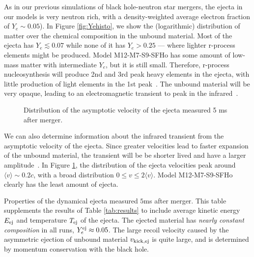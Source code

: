As in our previous simulations of black hole-neutron star mergers, the ejecta in our models is very neutron rich, with a density-weighted average electron fraction of $Y_e \sim 0.05$).  
In Figure \ref{fig:Yehisto}, we show the (logarithmic) distribution of matter over the chemical composition in the unbound material.  
Most of the ejecta has $Y_e \lesssim 0.07$ while none of it has $Y_e > 0.25$ --- where lighter r-process elements might be produced.  
Model M12-M7-S9-SFHo has some amount of low-mass matter with intermediate $Y_e$, but it is still small. 
Therefore, r-process nucleosynthesis will produce 2nd and 3rd peak heavy elements in the ejecta, with little production of light elements in the 1st peak~\cite{Lippuner2015}.  
The unbound material will be very opaque, leading to an electromagnetic transient to peak in the infrared~\cite{2013ApJ...775...18B}.

\begin{figure}
	\centering
	
	\caption[Distribution of the asymptotic velocity of the ejecta]{
		Distribution of the asymptotic velocity of the ejecta measured 5 ms after merger.
	}
	\label{fig:vrhisto}
\end{figure}

We can also determine information about the infrared transient from the asymptotic velocity of the ejecta.  
Since greater velocities lead to faster expansion of the unbound material, the transient will be be shorter lived and have a larger amplitude~\cite{2013ApJ...775...18B,Barnes:2016}. 
In Figure \ref{fig:vrhisto}, the distribution of the ejecta velocities peak around $\langle v \rangle \sim 0.2 c$, with a broad distribution  $ 0 \le v \le 2 \langle v \rangle $.
Model M12-M7-S9-SFHo clearly has the least amount of ejecta.

\begin{table}
	\begin{center}
		\caption[Measured ejecta quantities]{
			Properties of the dynamical ejecta measured $5$ms after merger.  This table supplements the results of Table \ref{tab:results} to include average kinetic energy $E_{\rm ej}$ and temperature $T_{\rm ej}$ of the ejecta.  The ejected material has \textit{nearly constant composition} in all runs, $Y_e^{\rm ej} \approx 0.05$.
			The large recoil velocity caused by the asymmetric ejection of unbound material $v_{\rm kick,ej}$ is quite large, and is determined by momentum conservation with the black hole.
		}
		\label{tab:ejecta}
		{
			
		}
	\end{center}
\end{table}

